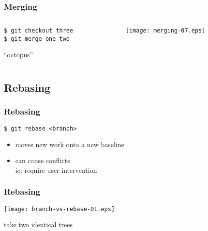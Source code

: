 \documentclass[english]{beamer}
\newcommand{\mysubsection}[2]{%
  \hypertarget{#2}{}%
  \subsection{#1}%
  \label{#2}%
}
\newcommand{\CMD}[1]{%
\texttt{\textcolor{code-blue}{#1}}%
}
\newcommand{\cmd}[1]{%
\texttt{\textcolor{code-orange}{#1}}%
}
\newcommand{\faint}[1]{%
\textcolor{code-gray}{#1}%
}
\newcommand{\red}[1]{%
\textcolor{code-red}{#1}%
}
\begin{document}
\begin{frame}
\frametitle{Merging}

\begin{columns}[t]
        \begin{column}[T]{.5\textwidth}
                {\small
                \cmd{\$ git checkout three} \\
                \CMD{\$ git merge one two} \\
                }
                \vspace{.2\textheight}
                \begin{center}
                        ``octopus''
                \end{center}
        \end{column}
        \begin{column}[T]{.5\textwidth}
                \texttt{[image: merging-07.eps]}
        \end{column}
\end{columns}
\end{frame}

\mysubsection{Rebasing}{using:rebasing}
\begin{frame}
\frametitle{Rebasing}

\CMD{\$ git rebase <branch>} \\
\begin{itemize}
        \item moves new work onto a new baseline
        \item can cause \red{conflicts} \\
                \faint{ie: require user intervention}
\end{itemize}
\end{frame}

\begin{frame}
\frametitle{Rebasing}

\texttt{[image: branch-vs-rebase-01.eps]}
\vspace{\baselineskip}
\begin{center}
        take two identical trees
\end{center}
\vspace{\textheight}
\end{frame}
\end{document}

